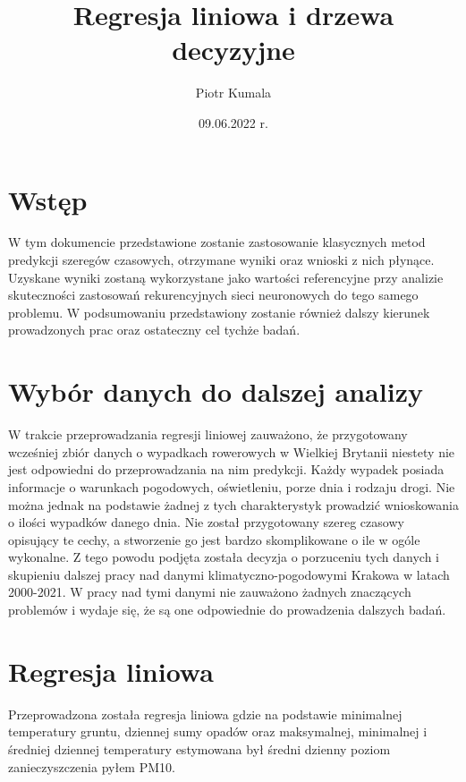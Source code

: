 \documentclass{article}
\title{Regresja liniowa i drzewa decyzyjne}
\author{Piotr Kumala}
\date{09.06.2022 r.}
\begin{document}
	
	\maketitle
	
	\section{Wstęp}
	W tym dokumencie przedstawione zostanie zastosowanie klasycznych metod predykcji szeregów czasowych, otrzymane wyniki oraz wnioski z nich płynące. Uzyskane wyniki zostaną wykorzystane jako wartości referencyjne przy analizie skuteczności zastosowań rekurencyjnych sieci neuronowych do tego samego problemu. W podsumowaniu przedstawiony zostanie również dalszy kierunek prowadzonych prac oraz ostateczny cel tychże badań. 
	
	\section{Wybór danych do dalszej analizy}
	W trakcie przeprowadzania regresji liniowej zauważono, że przygotowany wcześniej zbiór danych o wypadkach rowerowych w Wielkiej Brytanii niestety nie jest odpowiedni do przeprowadzania na nim predykcji. Każdy wypadek posiada informacje o warunkach pogodowych, oświetleniu, porze dnia i rodzaju drogi. Nie można jednak na podstawie żadnej z tych charakterystyk prowadzić wnioskowania o ilości wypadków danego dnia. Nie został przygotowany szereg czasowy opisujący te cechy, a stworzenie go jest bardzo skomplikowane o ile w ogóle wykonalne. 
	Z tego powodu podjęta została decyzja o porzuceniu tych danych i skupieniu dalszej pracy nad danymi klimatyczno-pogodowymi Krakowa w latach 2000-2021. W pracy nad tymi danymi nie zauważono żadnych znaczących problemów i wydaje się, że są one odpowiednie do prowadzenia dalszych badań. 
	
	
	\section{Regresja liniowa}
	Przeprowadzona została regresja liniowa gdzie na podstawie minimalnej temperatury gruntu, dziennej sumy opadów oraz maksymalnej, minimalnej i średniej dziennej temperatury estymowana był średni dzienny poziom zanieczyszczenia pyłem PM10. 
	
\end{document}

